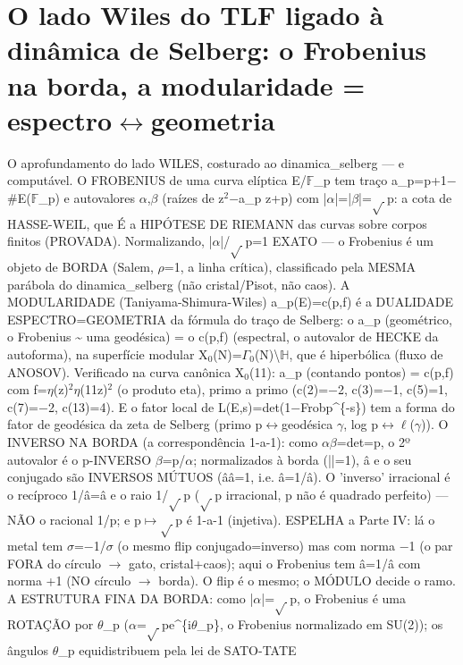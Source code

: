 \documentclass[11pt,a4paper]{article}
\begin{document}
\section{O lado Wiles do TLF ligado à dinâmica de Selberg: o Frobenius na borda, a modularidade = espectro\ensuremath{\leftrightarrow}geometria}
O aprofundamento do lado WILES, costurado ao dinamica\_selberg — e computável. O FROBENIUS de uma curva elíptica E/\ensuremath{\mathbb{F}}\_p tem traço a\_p=p+1\ensuremath{-}\#E(\ensuremath{\mathbb{F}}\_p) e autovalores \ensuremath{\alpha},\ensuremath{\beta} (raízes de z\ensuremath{^{2}}\ensuremath{-}a\_p z+p) com |\ensuremath{\alpha}|=|\ensuremath{\beta}|=\ensuremath{\sqrt{\,}}p: a cota de HASSE-WEIL, que É a HIPÓTESE DE RIEMANN das curvas sobre corpos finitos (PROVADA). Normalizando, |\ensuremath{\alpha}|/\ensuremath{\sqrt{\,}}p=1 EXATO — o Frobenius é um objeto de BORDA (Salem, \ensuremath{\rho}=1, a linha crítica), classificado pela MESMA parábola do dinamica\_selberg (não cristal/Pisot, não caos). A MODULARIDADE (Taniyama-Shimura-Wiles) a\_p(E)=c(p,f) é a DUALIDADE ESPECTRO=GEOMETRIA da fórmula do traço de Selberg: o a\_p (geométrico, o Frobenius \~{} uma geodésica) = o c(p,f) (espectral, o autovalor de HECKE da autoforma), na superfície modular X\ensuremath{_{0}}(N)=\ensuremath{\Gamma}\ensuremath{_{0}}(N)\textbackslash{}\ensuremath{\mathbb{H}}, que é hiperbólica (fluxo de ANOSOV). Verificado na curva canônica X\ensuremath{_{0}}(11): a\_p (contando pontos) = c(p,f) com f=\ensuremath{\eta}(z)\ensuremath{^{2}}\ensuremath{\eta}(11z)\ensuremath{^{2}} (o produto eta), primo a primo (c(2)=\ensuremath{-}2, c(3)=\ensuremath{-}1, c(5)=1, c(7)=\ensuremath{-}2, c(13)=4). E o fator local de L(E,s)=det(1\ensuremath{-}Frob\textperiodcentered p\^{}\{-s\}) tem a forma do fator de geodésica da zeta de Selberg (primo p\ensuremath{\leftrightarrow}geodésica \ensuremath{\gamma}, log p\ensuremath{\leftrightarrow}\ensuremath{\ell}(\ensuremath{\gamma})). O INVERSO NA BORDA (a correspondência 1-a-1): como \ensuremath{\alpha}\textperiodcentered \ensuremath{\beta}=det=p, o 2º autovalor é o p-INVERSO \ensuremath{\beta}=p/\ensuremath{\alpha}; normalizados à borda (|\textperiodcentered |=1), â e o seu conjugado são INVERSOS MÚTUOS (â\textperiodcentered â\ensuremath{}=1, i.e. â\ensuremath{}=1/â). O 'inverso' irracional é o recíproco 1/â=â\ensuremath{} e o raio 1/\ensuremath{\sqrt{\,}}p (\ensuremath{\sqrt{\,}}p irracional, p não é quadrado perfeito) — NÃO o racional 1/p; e p\ensuremath{\mapsto}\ensuremath{\sqrt{\,}}p é 1-a-1 (injetiva). ESPELHA a Parte IV: lá o metal tem \ensuremath{\sigma}\ensuremath{}=\ensuremath{-}1/\ensuremath{\sigma} (o mesmo flip conjugado=inverso) mas com norma \ensuremath{-}1 (o par FORA do círculo \ensuremath{\to} gato, cristal+caos); aqui o Frobenius tem â\ensuremath{}=1/â com norma +1 (NO círculo \ensuremath{\to} borda). O flip é o mesmo; o MÓDULO decide o ramo. A ESTRUTURA FINA DA BORDA: como |\ensuremath{\alpha}|=\ensuremath{\sqrt{\,}}p, o Frobenius é uma ROTAÇÃO por \ensuremath{\theta}\_p (\ensuremath{\alpha}=\ensuremath{\sqrt{\,}}p\textperiodcentered e\^{}\{i\ensuremath{\theta}\_p\}, o Frobenius normalizado em SU(2)); os ângulos \ensuremath{\theta}\_p equidistribuem pela lei de SATO-TATE 
\end{document}
